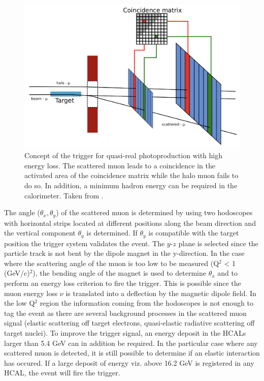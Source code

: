 \begin{figure}[!h]
  \centering
	\includegraphics[scale=0.5]{./gfx/TriggerLogic.png}
	\caption{Concept of the trigger for quasi-real photoproduction with high energy loss. The scattered muon leads to a coincidence in the activated area of the coincidence matrix while the halo muon fails to do so. In addition, a minimum hadron energy can be required in the calorimeter. Taken from \cite{NIM}.}
	\label{pic:triglogic}
\end{figure}

The angle ($\theta_x,\theta_y$) of the scattered muon is determined by using two hodoscopes with horizontal strips located at different positions along the beam direction and the vertical component $\theta_y$ is determined. If $\theta_y$ is compatible with the target position the trigger system validates the event. The $y$-$z$ plane is selected since the particle track is not bent by the dipole magnet in the y-direction. In the case where the scattering angle of the muon is too low to be measured (Q$^2$ < 1 (GeV/c)$^2$), the bending angle of the magnet is used to determine $\theta_x$ and to perform an energy loss criterion to fire the trigger. This is possible since the muon energy loss $\nu$ is translated into a deflection by the magnetic dipole field. In the low Q$^2$ region the information coming from the hodoscopes is not enough to tag the event as there are several background processes in the scattered muon signal (elastic scattering off target electrons, quasi-elastic radiative scattering off target nuclei). To improve the trigger signal, an energy deposit in the HCALs larger than 5.4 GeV can in addition be required. In the particular case where any scattered muon is detected, it is still possible to determine if an elastic interaction has occured. If a large deposit of energy viz. above 16.2 GeV is registered in any HCAL, the event will fire the trigger.

